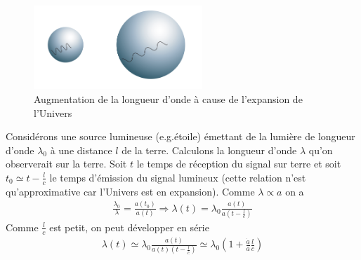\documentclass[a4paper,12pt]{report}
\theoremstyle{plain}
\theoremstyle{plain}
\begin{document}
      	
      	
      	
\begin{figure}[h]
\begin{center}
\includegraphics[width=15pc]{t2.png}
\caption{Augmentation de la longueur d'onde \`a cause de l'expansion de l'Univers}
\end{center}
\end{figure}
      	\qquad Consid\'erons une source lumineuse (e.g.\'etoile) \'emettant de la lumi\`ere de longueur d'onde $\lambda_0$ \`a une distance $l$ de la terre. Calculons la longueur d'onde $\lambda$ qu'on observerait sur la terre. Soit $t$ le temps de r\'eception du signal sur terre et soit $t_0\simeq t-\frac{l}{c}$ le temps d'\'emission du signal lumineux (cette relation n'est qu'approximative car l'Univers est en expansion). Comme $\lambda \propto a$ on a 
      	\begin{eqnarray}
      	\frac{\lambda_0}{\lambda}=\frac{a\left( t_0\right) }{a\left(t \right) }\Rightarrow \lambda\left( t\right) =\lambda_0 \frac{a\left( t\right) }{a\left( t-\frac{l}{c}\right) }
      	\end{eqnarray}
      	Comme $\frac{l}{c}$ est petit, on peut d\'evelopper en s\'erie 
      	\begin{eqnarray}
      	\lambda\left( t\right) \simeq\lambda_0 \frac{a\left( t\right) }{a\left( t\right) \left( t-\frac{l}{c}\right) } \simeq \lambda_0\left(1+\frac{\dot{a}}{a} \frac{l}{c} \right) 
      	\end{eqnarray}
      	
\end{document}
